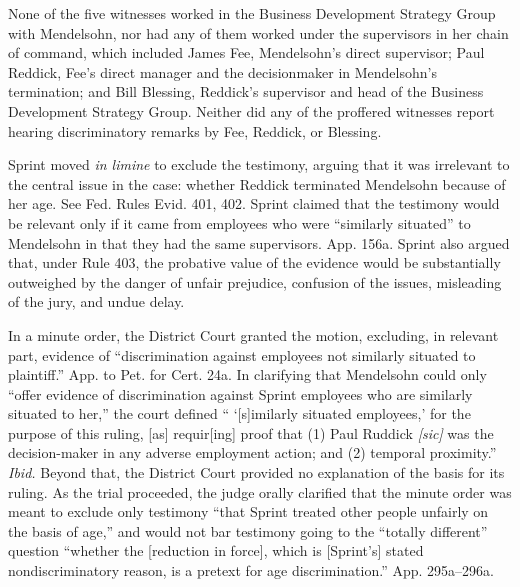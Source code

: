   None of the five witnesses worked in the Business Development Strategy
Group with Mendelsohn, nor had any of them worked under the supervisors
in her chain of command, which included James Fee, Mendelsohn's direct
supervisor; Paul Reddick, Fee's direct manager and the decisionmaker
in Mendelsohn's termination; and Bill Blessing, Reddick's supervisor
and head of the Business Development Strategy Group. Neither did any of
the proffered witnesses report hearing discriminatory remarks by Fee,
Reddick, or Blessing.

  Sprint moved \emph{in limine} to exclude the testimony, arguing that
it was irrelevant to the central issue in the case: whether Reddick
terminated Mendelsohn because of her age. See Fed. Rules Evid. 401, 402.
Sprint claimed that the testimony would be relevant only if it came from
employees who were ``similarly situated'' to Mendelsohn in that they
had the same supervisors. App. 156a. Sprint also argued that, under
Rule 403, the probative value of the evidence would be substantially
outweighed by the danger of unfair prejudice, confusion of the issues,
misleading of the jury, and undue delay.

  In a minute order, the District Court granted the motion, excluding,
in relevant part, evidence of ``discrimination against employees
not similarly situated to plaintiff.'' App. to Pet. for Cert.
24a. In clarifying that Mendelsohn could only ``offer evidence of
discrimination against Sprint employees who are similarly situated to
her,'' the court defined `` ‘[s]imilarly situated employees,' for
the purpose of this ruling, [as] requir[ing] proof that (1) Paul Ruddick
\emph{[sic]} was the decision-maker in any adverse employment action; and
(2) temporal proximity.'' \emph{Ibid.} Beyond that, the District
Court provided no explanation of the basis for its ruling. As the trial
proceeded, the judge orally clarified that the minute order was meant to
exclude only testimony ``that Sprint treated other people unfairly on
the basis of age,'' and would not bar testimony going to the ``totally
different'' question \newpage  ``whether the [reduction in force], which
is [Sprint's] stated nondiscriminatory reason, is a pretext for age
discrimination.'' App. 295a--296a.

